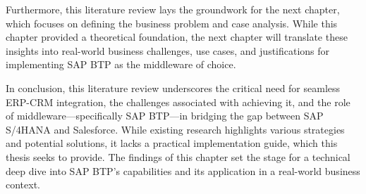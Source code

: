 Furthermore, this literature review lays the groundwork for the next chapter, which focuses on defining the business problem and case analysis. While this chapter provided a theoretical foundation, the next chapter will translate these insights into real-world business challenges, use cases, and justifications for implementing SAP BTP as the middleware of choice.

In conclusion, this literature review underscores the critical need for seamless ERP-CRM integration, the challenges associated with achieving it, and the role of middleware—specifically SAP BTP—in bridging the gap between SAP S/4HANA and Salesforce. While existing research highlights various strategies and potential solutions, it lacks a practical implementation guide, which this thesis seeks to provide. The findings of this chapter set the stage for a technical deep dive into SAP BTP’s capabilities and its application in a real-world business context.

\newpage


